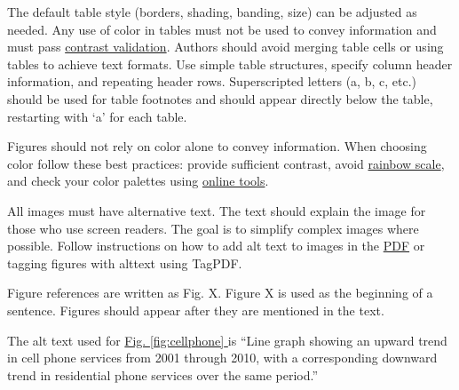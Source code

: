 \tagpdfparaOn
 
The default table style (borders, shading, banding, size) can be adjusted as needed. Any use of color in tables must not be used to convey information and must pass \href{https://support.microsoft.com/en-us/office/make-your-content-accessible-to-everyone-with-the-accessibility-checker-38059c2d-45ef-4830-9797-618f0e96f3ab}{contrast validation}. Authors should avoid merging table cells or using tables to achieve text formats. Use simple table structures, specify column header information, and repeating header rows. Superscripted letters (a, b, c, etc.) should be used for table footnotes and should appear directly below the table, restarting with ‘a’ for each table.

Figures should not rely on color alone to convey information. When choosing color follow these best practices: provide sufficient contrast, avoid \href{https://www.nature.com/articles/519291d}{rainbow scale}, and check your color palettes using \href{http://selection.datavisualization.ch/}{online tools}.

All images must have alternative text. The text should explain the image for those who use screen readers. The goal is to simplify complex images where possible. Follow instructions on how to add alt text to images in the \href{https://helpx.adobe.com/acrobat/using/editing-document-structure-content-tags.html#add_alternate_text_and_supplementary_information_to_tags}{PDF} or tagging figures with alttext using TagPDF.

Figure references are written as Fig. X. Figure X is used as the beginning of a sentence. Figures should appear after they are mentioned in the text. 

The alt text used for \href{https://equidox.co/blog/beyond-basic-alt-text-charts-maps-and-diagrams/}{Fig. \ref{fig:cellphone} } is “Line graph showing an upward trend in cell phone services from 2001 through 2010, with a corresponding downward trend in residential phone services over the same period.” 
 


